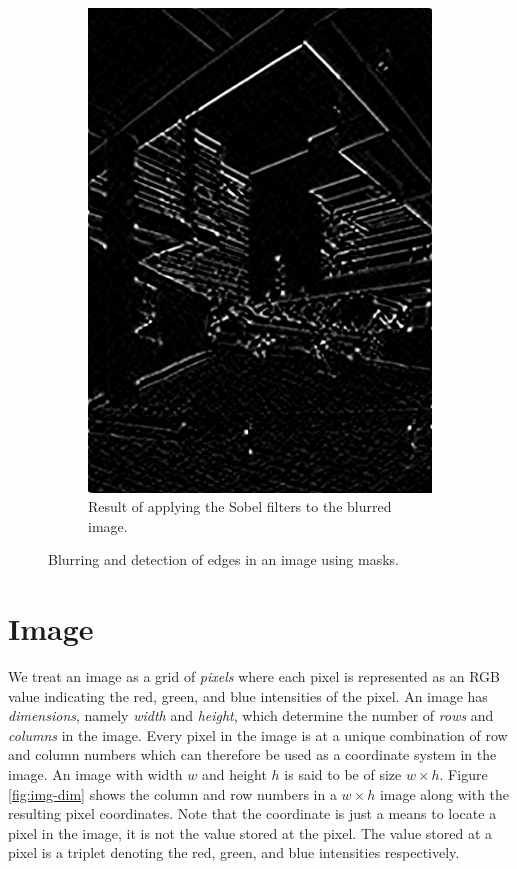 \documentclass[addpoints]{exam}
\begin{document}
\begin{figure}
\begin{subfigure}[c]{.31\textwidth}
    \includegraphics[width=\textwidth]{campus-edge-detect}
    \caption{Result of applying the Sobel filters to the blurred image.}\label{fig:mask-edge}
  \end{subfigure}
  \caption{Blurring and detection of edges in an image using masks.}
  \label{fig:mask-apply}
\end{figure}

\section{Image}

We treat an image as a grid of \textit{pixels} where each pixel is represented as an RGB value indicating the red, green, and blue intensities of the pixel. An image has \textit{dimensions}, namely \textit{width} and \textit{height}, which determine the number of \textit{rows} and \textit{columns} in the image. Every pixel in the image is at a unique combination of row and column numbers which can therefore be used as a coordinate system in the image. An image with width $w$ and height $h$ is said to be of size $w\times h$. Figure \ref{fig:img-dim} shows the column and row numbers in a $w\times h$ image along with the resulting pixel coordinates. Note that the coordinate is just a means to locate a pixel in the image, it is not the value stored at the pixel. The value stored at a pixel is a triplet denoting the red, green, and blue intensities respectively.
\end{document}
